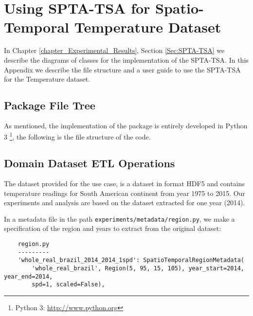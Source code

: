 \chapter{Using SPTA-TSA for Spatio-Temporal Temperature Dataset}
\label{apendiceA}

In Chapter \ref{chapter_Experimental_Results}, Section \ref{Sec:SPTA-TSA} we describe the diagrams of classes for the implementation of the SPTA-TSA. In this Appendix we describe the file structure and a user guide to use the SPTA-TSA for the Temperature dataset.

\section{Package File Tree}

As mentioned, the implementation of the package is entirely developed in Python 3 \footnote{Python 3: \url{http://www.python.org}}, the following is the file structure of the code.


\section{Domain Dataset ETL Operations}
\label{ap:dataset_extraction}

The dataset provided for the use case, is a dataset in format HDF5 and contains temperature readings for South American continent from year 1975 to 2015. Our experiments and analysis are based on the dataset extracted for one year (2014). 

In a metadata file in the path \texttt{experiments/metadata/region.py}, we make a specification of the region and years to extract from the original dataset:
\begin{verbatim}
    region.py
    ---------
    'whole_real_brazil_2014_2014_1spd': SpatioTemporalRegionMetadata(
        'whole_real_brazil', Region(5, 95, 15, 105), year_start=2014, year_end=2014, 
        spd=1, scaled=False),
\end{verbatim}

